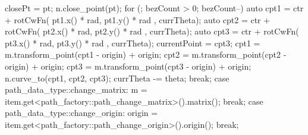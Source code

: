 \begin{codeblock}
{{{{      closePt = pt;
      n.close_point(pt);
    }
    for (; bezCount > 0; bezCount--) {
      auto cpt1 = ctr + rotCwFn({ pt1.x() * rad, pt1.y() * rad }, currTheta);
      auto cpt2 = ctr + rotCwFn({ pt2.x() * rad, pt2.y() * rad }, currTheta);
      auto cpt3 = ctr + rotCwFn({ pt3.x() * rad, pt3.y() * rad }, currTheta);
      currentPoint = cpt3;
      cpt1 = m.transform_point(cpt1 - origin) + origin;
      cpt2 = m.transform_point(cpt2 - origin) + origin;
      cpt3 = m.transform_point(cpt3 - origin) + origin;
      n.curve_to(cpt1, cpt2, cpt3);
      currTheta -= theta;
    }
  } break;
  case path_data_type::change_matrix:
  {
    m = item.get<path_factory::path_change_matrix>().matrix();
  } break;
  case path_data_type::change_origin:
  {
    origin = item.get<path_factory::path_change_origin>().origin();
  } break;
  }
}
\end{codeblock}

%
%
%
%	
%	
%
%
